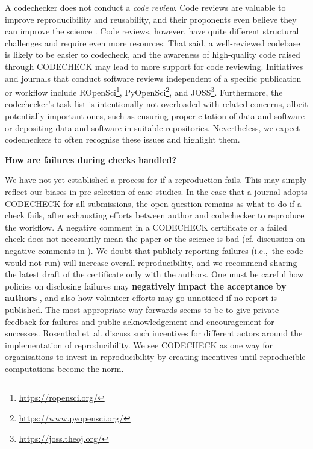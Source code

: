\documentclass[12pt]{article}
\begin{document}
A codechecker does not conduct a \emph{code review}. Code reviews are
valuable to improve reproducibility and reusability, and their
proponents even believe they can improve the science
\cite{petre_code_2014}.  Code reviews, however, have quite different
structural challenges and require even more resources. That said, a
well-reviewed codebase is likely to be easier to codecheck, and the
awareness of high-quality code raised through CODECHECK may lead to
more support for code reviewing.  Initiatives and journals that
conduct software reviews independent of a specific publication or
workflow include ROpenSci\footnote{\url{https://ropensci.org/}},
PyOpenSci\footnote{\url{https://www.pyopensci.org/}}, and
JOSS\footnote{\url{https://joss.theoj.org/}}.  Furthermore, the
codechecker's task list is intentionally not overloaded with related
concerns, albeit potentially important ones, such as ensuring proper
citation of data and software or depositing data and software in
suitable repositories. Nevertheless, we expect codecheckers to often
recognise these issues and highlight them.

\textbf{How are failures during checks handled?}

We have not yet established a process for if a reproduction fails.  This
may simply reflect our biases in pre-selection of case studies.  In
the case that a journal adopts CODECHECK for all submissions, the open
question remains as what to do if a check fails, after exhausting
efforts between author and codechecker to reproduce the workflow.  A
negative comment in a CODECHECK certificate or a failed check does not
necessarily mean the paper or the science is bad (cf. discussion on
negative comments in \cite{everythinghertz123}).  We doubt that
publicly reporting failures (i.e.,~the code would not run) will
increase overall reproducibility, and we recommend sharing the latest
draft of the certificate only with the authors.  One must be careful
how policies on disclosing failures may \textbf{negatively impact the
  acceptance by authors}
, and also how volunteer efforts may go unnoticed if no report is
published.  The most appropriate way forwards seems to be to give
private feedback for failures and public acknowledgement and
encouragement for successes.
Rosenthal et~al. \cite{Rosenthal2016b} discuss such incentives for different actors around the
implementation of reproducibility. We see CODECHECK as one way for
organisations to invest in reproducibility by creating incentives
until reproducible computations become the norm.
\end{document}
